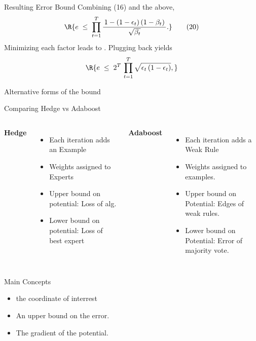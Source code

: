 \documentclass{beamer}
\begin{document}
\begin{frame}{Resulting Error Bound}
Combining (16) and the above,
\[
  \R{
    e 
    \;\le\;
    \prod_{t=1}^T \frac{\,1 - (1-\epsilon_t)\,(1-\beta_t)\,}{\sqrt{\beta_t}}.
  }
  \tag{20}
\]
Minimizing each factor leads to . Plugging back yields
\[
  \R{
    e 
    \;\le\;
    2^T \,\prod_{t=1}^T \sqrt{\epsilon_t\,(1-\epsilon_t)},
  }
\]
\end{frame}

\begin{frame}{Alternative forms of the bound}
\end{frame}



\begin{frame}{Comparing Hedge vs Adaboost}
  \begin{columns}[T,onlytextwidth] 

    \textbf{Hedge}
    \begin{itemize}
      \item Each iteration adds an Example
      \item Weights assigned to Experts
      \item Upper bound on potential: Loss of alg.
      \item Lower bound on potential: Loss of best expert
    \end{itemize}

    \textbf{Adaboost}
    \begin{itemize}
    \item Each iteration adds a Weak Rule
    \item Weights assigned to examples.
    \item Upper bound on Potential: Edges of weak rules.
    \item Lower bound on Potential: Error of majority vote.
    \end{itemize}

  \end{columns}
\end{frame}

\begin{frame}{Main Concepts}
  \begin{itemize}
    \item {} the coordinate of interrest 
  \item {} An upper bound on the error. 
  \item {} The gradient of the potential. 
  \end{itemize}

  
  \end{frame}
\end{document}
